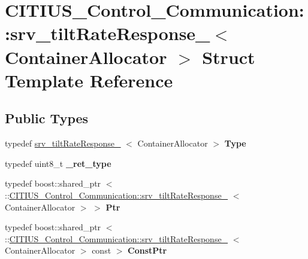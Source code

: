 \hypertarget{struct_c_i_t_i_u_s___control___communication_1_1srv__tilt_rate_response__}{\section{\-C\-I\-T\-I\-U\-S\-\_\-\-Control\-\_\-\-Communication\-:\-:srv\-\_\-tilt\-Rate\-Response\-\_\-$<$ \-Container\-Allocator $>$ \-Struct \-Template \-Reference}
\label{struct_c_i_t_i_u_s___control___communication_1_1srv__tilt_rate_response__}
}
\subsection*{\-Public \-Types}
\begin{DoxyCompactItemize}
\item 
\hypertarget{struct_c_i_t_i_u_s___control___communication_1_1srv__tilt_rate_response___a1b5605afe2e9eae46cbf35f9367c1c65}{typedef \hyperlink{struct_c_i_t_i_u_s___control___communication_1_1srv__tilt_rate_response__}{srv\-\_\-tilt\-Rate\-Response\-\_\-}\*
$<$ \-Container\-Allocator $>$ {\bfseries \-Type}}\label{struct_c_i_t_i_u_s___control___communication_1_1srv__tilt_rate_response___a1b5605afe2e9eae46cbf35f9367c1c65}

\item 
\hypertarget{struct_c_i_t_i_u_s___control___communication_1_1srv__tilt_rate_response___aa82cc29567555fc2458c48c3301ec1fd}{typedef uint8\-\_\-t {\bfseries \-\_\-ret\-\_\-type}}\label{struct_c_i_t_i_u_s___control___communication_1_1srv__tilt_rate_response___aa82cc29567555fc2458c48c3301ec1fd}

\item 
\hypertarget{struct_c_i_t_i_u_s___control___communication_1_1srv__tilt_rate_response___aa1d71165df7502fa2256c451200bf001}{typedef boost\-::shared\-\_\-ptr\*
$<$ \-::\hyperlink{struct_c_i_t_i_u_s___control___communication_1_1srv__tilt_rate_response__}{\-C\-I\-T\-I\-U\-S\-\_\-\-Control\-\_\-\-Communication\-::srv\-\_\-tilt\-Rate\-Response\-\_\-}\*
$<$ \-Container\-Allocator $>$ $>$ {\bfseries \-Ptr}}\label{struct_c_i_t_i_u_s___control___communication_1_1srv__tilt_rate_response___aa1d71165df7502fa2256c451200bf001}

\item 
\hypertarget{struct_c_i_t_i_u_s___control___communication_1_1srv__tilt_rate_response___a3b153a5615042139613217adfc2870f5}{typedef boost\-::shared\-\_\-ptr\*
$<$ \-::\hyperlink{struct_c_i_t_i_u_s___control___communication_1_1srv__tilt_rate_response__}{\-C\-I\-T\-I\-U\-S\-\_\-\-Control\-\_\-\-Communication\-::srv\-\_\-tilt\-Rate\-Response\-\_\-}\*
$<$ \-Container\-Allocator $>$ const  $>$ {\bfseries \-Const\-Ptr}}\label{struct_c_i_t_i_u_s___control___communication_1_1srv__tilt_rate_response___a3b153a5615042139613217adfc2870f5}

\end{DoxyCompactItemize}
